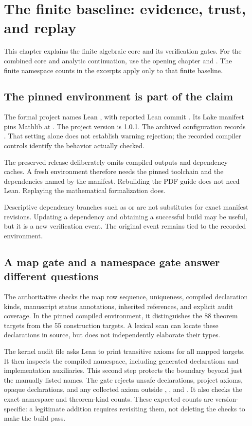 \clearpage
\section{The finite baseline: evidence, trust, and replay}
This chapter explains the finite algebraic core and its verification gates. For the combined core and analytic continuation, use the opening chapter and . The finite namespace counts in the excerpts apply only to that finite baseline.
\subsection{The pinned environment is part of the claim}
The formal project names Lean , with reported Lean commit . Its Lake manifest pins Mathlib at . The project version is 1.0.1. The archived configuration records . That setting alone does not establish warning rejection; the recorded compiler controls identify the behavior actually checked.

The preserved release deliberately omits compiled outputs and dependency caches. A fresh environment therefore needs the pinned toolchain and the dependencies named by the manifest. Rebuilding the PDF guide does not need Lean. Replaying the mathematical formalization does.

Descriptive dependency branches such as  or  are not substitutes for exact manifest revisions. Updating a dependency and obtaining a successful build may be useful, but it is a new verification event. The original event remains tied to the recorded environment.

\subsection{A map gate and a namespace gate answer different questions}
The authoritative  checks the map row sequence, uniqueness, compiled declaration kinds, manuscript status annotations, inherited references, and explicit audit coverage. In the pinned compiled environment, it distinguishes the 88 theorem targets from the 55 construction targets. A lexical scan can locate these declarations in source, but does not independently elaborate their types.

The kernel audit file asks Lean to print transitive axioms for all mapped targets. It then inspects the compiled  namespace, including generated declarations and implementation auxiliaries. This second step protects the boundary beyond just the manually listed names.
The gate rejects unsafe declarations, project axioms, opaque declarations, and any collected axiom outside , , and . It also checks the exact namespace and theorem-kind counts. These expected counts are version-specific: a legitimate addition requires revisiting them, not deleting the checks to make the build pass.

